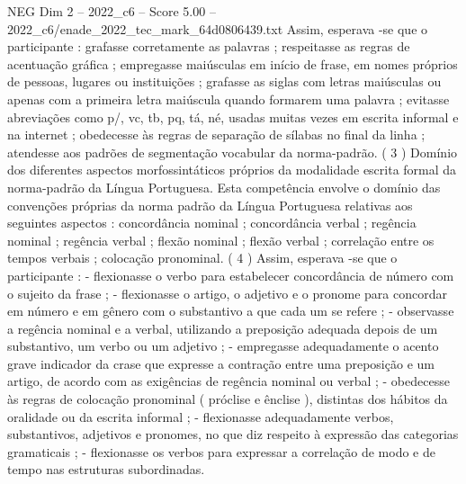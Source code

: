 \begin{textsample}{NEG Dim 2 – 2022\_c6 – Score 5.00 – 2022\_c6/enade\_2022\_tec\_mark\_64d0806439.txt}
Assim, esperava -se que o participante : grafasse corretamente as palavras ; respeitasse as regras de acentuação gráfica ; empregasse maiúsculas em início de frase, em nomes próprios de pessoas, lugares ou instituições ; grafasse as siglas com letras maiúsculas ou apenas com a primeira letra maiúscula quando formarem uma palavra ; evitasse abreviações como p/, vc, tb, pq, tá, né, usadas muitas vezes em escrita informal e na internet ; obedecesse às regras de separação de sílabas no final da linha ; atendesse aos padrões de segmentação vocabular da norma-padrão. ( 3 ) Domínio dos diferentes aspectos morfossintáticos próprios da modalidade escrita formal da norma-padrão da Língua Portuguesa.
Esta competência envolve o domínio das convenções próprias da norma padrão da Língua Portuguesa relativas aos seguintes aspectos : concordância nominal ; concordância verbal ; regência nominal ; regência verbal ; flexão nominal ; flexão verbal ; correlação entre os tempos verbais ; colocação pronominal. ( 4 ) Assim, esperava -se que o participante : - flexionasse o verbo para estabelecer concordância de número com o sujeito da frase ; - flexionasse o artigo, o adjetivo e o pronome para concordar em número e em gênero com o substantivo a que cada um se refere ; - observasse a regência nominal e a verbal, utilizando a preposição adequada depois de um substantivo, um verbo ou um adjetivo ; - empregasse adequadamente o acento grave indicador da crase que expresse a contração entre uma preposição e um artigo, de acordo com as exigências de regência nominal ou verbal ; - obedecesse às regras de colocação pronominal ( próclise e ênclise ), distintas dos hábitos da oralidade ou da escrita informal ; - flexionasse adequadamente verbos, substantivos, adjetivos e pronomes, no que diz respeito à expressão das categorias gramaticais ; - flexionasse os verbos para expressar a correlação de modo e de tempo nas estruturas subordinadas.

\end{textsample}
